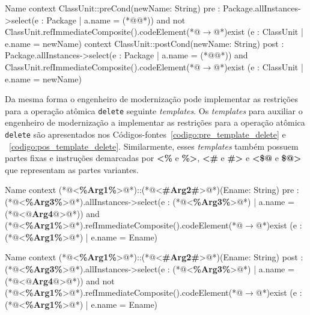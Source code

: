 \begin{codigo}[caption={[Asserções em OCL para realizar a operação atômica \texttt{add}.] Asserções em OCL para realizar a operação atômica \texttt{add}.},escapeinside={(*@}{@*)}, basicstyle=\footnotesize, label={codigo:template_assercao_juntado_add}, language=OCL]{Name}
context ClassUnit::preCond(newName: String)
pre : Package.allInstances->select(e : Package | a.name = (*@@*)) and not ClassUnit.refImmediateComposite().codeElement(*@$\rightarrow$@*)exist (e : ClassUnit | e.name = newName)
context ClassUnit::postCond(newName: String)
post : Package.allInstances->select(e : Package | a.name = (*@@*)) and ClassUnit.refImmediateComposite().codeElement(*@$\rightarrow$@*)exist (e : ClassUnit | e.name = newName)
\end{codigo}

Da mesma forma o engenheiro de modernização pode implementar as restrições para a operação atômica \texttt{delete} seguinte \textit{templates}. Os \textit{templates} para auxiliar o engenheiro de modernização a implementar as restrições para a operação atômica \texttt{delete} são apresentados nos Códigos-fontes~\ref{codigo:pre_template_delete} e ~\ref{codigo:pos_template_delete}. Similarmente, esses \textit{templates} também possuem partes fixas e instruções demarcadas por \textbf{<\%} e \textbf{\%>}, \textbf{<\#} e \textbf{\#>} e \textbf{<\$@} e \textbf{\$@>} que representam as partes variantes.

\begin{codigo}[caption={[\textit{Template} OCL para realizar a pré-condição da operação atômica \texttt{delete}.] \textit{Template} OCL para realizar a pré-condição da operação atômica \texttt{delete}.},escapeinside={(*@}{@*)}, basicstyle=\footnotesize, label={codigo:pre_template_delete}, language=OCL]{Name}
context (*@<\textbf{\%Arg1\%}>@*)::(*@<\textbf{\#Arg2\#}>@*)(Ename: String)
pre : (*@<\textbf{\%Arg3\%}>@*).allInstances->select(e : (*@<\textbf{\%Arg3\%}>@*) | a.name = (*@<\textbf{$@$Arg4$@$}>@*)) and (*@<\textbf{\%Arg1\%}>@*).refImmediateComposite().codeElement(*@$\rightarrow$@*)exist (e : (*@<\textbf{\%Arg1\%}>@*) | e.name = Ename)
\end{codigo}

\begin{codigo}[caption={[\textit{Template} OCL para realizar a pós-condição da operação atômica \texttt{delete}.] \textit{Template} OCL para realizar a pós-condição da operação atômica \texttt{delete}.},escapeinside={(*@}{@*)}, basicstyle=\footnotesize, label={codigo:pos_template_delete}, language=OCL]{Name}
context (*@<\textbf{\%Arg1\%}>@*)::(*@<\textbf{\#Arg2\#}>@*)(Ename: String)
post : (*@<\textbf{\%Arg3\%}>@*).allInstances->select(e : (*@<\textbf{\%Arg3\%}>@*) | a.name = (*@<\textbf{$@$Arg4$@$}>@*)) and not (*@<\textbf{\%Arg1\%}>@*).refImmediateComposite().codeElement(*@$\rightarrow$@*)exist (e : (*@<\textbf{\%Arg1\%}>@*) | e.name = Ename)
\end{codigo}

